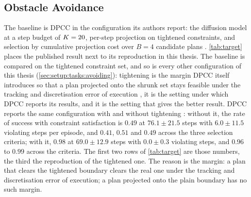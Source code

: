 \subsection{Obstacle Avoidance}\label{sec:setup:baselines:avoiding}

The baseline is \ac{DPCC} in the configuration its authors report: the diffusion model at a step budget
of $K=20$, per-step projection on tightened constraints, and selection by
cumulative projection cost over $B=4$ candidate plans \parencite[Sec.~6.1]{romer2025diffusion}.
\autoref{tab:target} places the published result next to its reproduction in this thesis. The baseline is
compared on the tightened constraint set, and so is every other configuration of this thesis
(\autoref{sec:setup:tasks:avoiding}): tightening is the margin \ac{DPCC} itself introduces so that a plan
projected onto the shrunk set stays feasible under the tracking and discretisation error of execution
\parencite[Sec.~5.3]{romer2025diffusion}, it is the setting under which \ac{DPCC} reports its results, and it
is the setting that gives the better result. \ac{DPCC} reports the same configuration with and without
tightening \parencite[Table~1 and Fig.~2]{romer2025diffusion}: without it, the rate of success with
constraint satisfaction is $0.49$ at $76.1\pm21.5$ steps with $6.0\pm11.5$ violating steps per episode,
and $0.41$, $0.51$ and $0.49$ across the three selection criteria; with it, $0.98$ at $69.0\pm12.9$ steps
with $0.0\pm0.3$ violating steps, and $0.96$ to $0.99$ across the criteria. The first two rows of
\autoref{tab:target} are those numbers, the third the reproduction of the tightened one. The
reason is the margin: a plan that clears the tightened boundary clears the real one under the tracking
and discretisation error of execution; a plan projected onto the plain boundary has no such margin.

